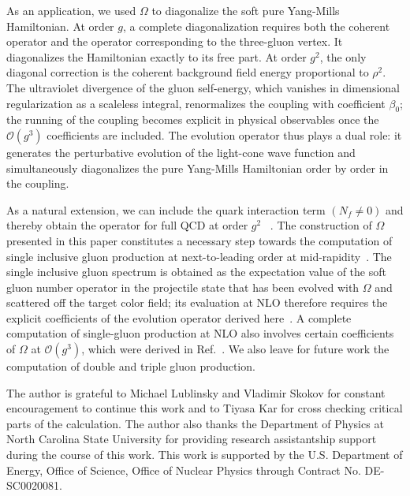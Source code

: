 \documentclass[a4paper,11pt]{article}
\begin{document}
As an application, we used $\Omega$ to diagonalize the soft pure Yang-Mills Hamiltonian. At order $g$, a complete diagonalization requires both the coherent operator and the operator corresponding to the three-gluon vertex. It diagonalizes the Hamiltonian exactly to its free part. At order $g^{2}$, the only diagonal correction is the coherent background field energy proportional to $\rho^{2}$. {\color{chg}The ultraviolet divergence of the gluon self-energy, which vanishes in dimensional regularization as a scaleless integral, renormalizes the coupling with coefficient $\beta_{0}$; the running of the coupling becomes explicit in physical observables once the $\mathcal{O}(g^{3})$ coefficients are included.} The evolution operator thus plays a dual role: it generates the perturbative evolution of the light-cone wave function and simultaneously diagonalizes the pure Yang-Mills Hamiltonian order by order in the coupling.

As a natural extension, we can include the quark interaction term $(N_f \neq 0)$ and thereby obtain the operator for full QCD at order $g^2$ ~\cite{rr1}. The construction of $\Omega$ presented in this paper constitutes a necessary step towards the computation of single inclusive gluon production at next-to-leading order at mid-rapidity~\cite{rr}. The single inclusive gluon spectrum is obtained as the expectation value of the soft gluon number operator in the projectile state that has been evolved with $\Omega$ and scattered off the target color field; its evaluation at NLO therefore requires the explicit coefficients of the evolution operator derived here~\cite{Kovner:2006wr}. A complete computation of single-gluon production at NLO also involves certain coefficients of $\Omega$ at $\mathcal{O}(g^{3})$, which were derived in Ref.~\cite{Lublinsky:2016meo}. We also leave for future work the computation of double and triple gluon production.

\acknowledgments
The author is grateful to Michael Lublinsky and Vladimir Skokov for constant encouragement to continue this work and to Tiyasa Kar for cross checking critical parts of the calculation. The author also thanks the Department of Physics at North Carolina State University for providing research assistantship support during the course of this work. This work is supported by the U.S. Department of Energy, Office of Science, Office of Nuclear Physics through Contract No. DE-SC0020081.
\appendix
\end{document}
